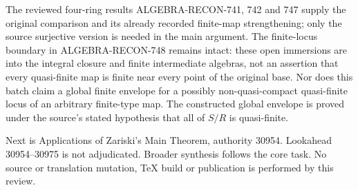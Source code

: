 The reviewed four-ring results ALGEBRA-\AlgebraIdentifierBreak{}RECON-\AlgebraIdentifierBreak{}741, 742 and 747 supply the original comparison and its already recorded finite-map strengthening; only the source surjective version is needed in the main argument. The finite-locus boundary in ALGEBRA-\AlgebraIdentifierBreak{}RECON-\AlgebraIdentifierBreak{}748 remains intact: these open immersions are into the integral closure and finite intermediate algebras, not an assertion that every quasi-finite map is finite near every point of the original base. Nor does this batch claim a global finite envelope for a possibly non-quasi-compact quasi-finite locus of an arbitrary finite-type map. The constructed global envelope is proved under the source's stated hypothesis that all of \(S/R\) is quasi-finite.

Next is Applications of Zariski's Main Theorem, authority 30954. Lookahead 30954--30975 is not adjudicated. Broader synthesis follows the core task. No source or translation mutation, TeX build or publication is performed by this review.
